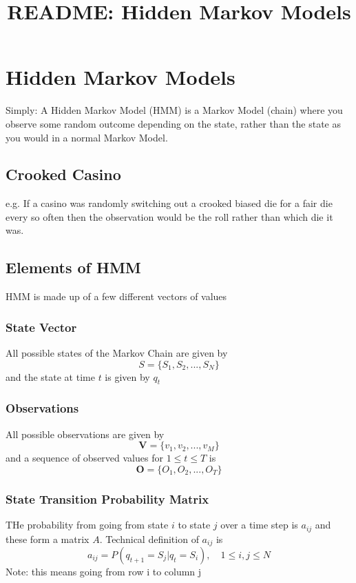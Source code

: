 \documentclass[]{article}
\title{README: Hidden Markov Models}
\author{}
\begin{document}
	\maketitle
	\section{Hidden Markov Models}
		Simply: A Hidden Markov Model (HMM) is a Markov Model (chain) where you observe some random outcome depending on the state, rather than the state as you would in a normal Markov Model. 
		\subsection{Crooked Casino}
			e.g. If a casino was randomly switching out a crooked biased die for a fair die every so often then the observation would be the roll rather than which die it was. 
		\subsection{Elements of HMM}
			HMM is made up of a few different vectors of values
			\subsubsection{State Vector}
				All possible states of the Markov Chain are given by 
				\begin{equation}
					S=\lbrace S_1,S_2,...,S_N\rbrace
				\end{equation}
				and the state at time $t$ is given by $q_t$
			\subsubsection{Observations}
				All possible observations are given by
				\begin{equation}
					\mathbf{V}=\lbrace v_1, v_2, ..., v_M\rbrace
				\end{equation}
				and a sequence of observed values for $1\le t\le T$ is 
				\begin{equation}
					\mathbf{O}=\lbrace O_1,O_2,...,O_T\rbrace
				\end{equation}
			\subsubsection{State Transition Probability Matrix}
				THe probability from going from state $i$ to state $j$ over a time step is $a_{ij}$ and these form a matrix $A$. Technical definition of $a_{ij}$ is
				\begin{equation}
					a_{ij}=P\left( q_{t+1}=S_j | q_t=S_i\right), \quad 1 \le i,j \le N 
				\end{equation}
				Note: this means going from row i to column j 
\end{document}
